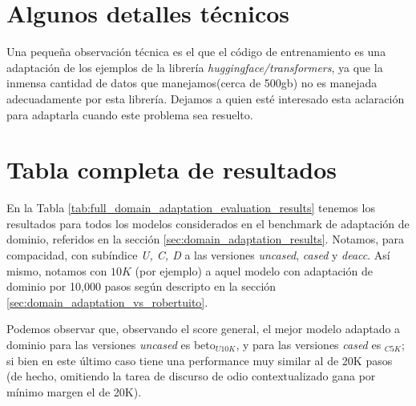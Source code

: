 
\section{Algunos detalles técnicos}

Una pequeña observación técnica es el que el código de entrenamiento es una adaptación de los ejemplos de la librería \emph{huggingface/transformers}, ya que la inmensa cantidad de datos que manejamos(cerca de 500gb) no es manejada adecuadamente por esta librería. Dejamos a quien esté interesado esta aclaración para adaptarla cuando este problema sea resuelto.

\section{Tabla completa de resultados}



En la Tabla \ref{tab:full_domain_adaptation_evaluation_results} tenemos los resultados para todos los modelos considerados en el benchmark de adaptación de dominio, referidos en la sección \ref{sec:domain_adaptation_results}. Notamos, para compacidad, con subíndice \emph{U, C, D} a las versiones  \emph{uncased}, \emph{cased} y \emph{deacc}. Así mismo, notamos con $10K$ (por ejemplo) a aquel modelo con adaptación de dominio por 10,000 pasos según descripto en la sección \ref{sec:domain_adaptation_vs_robertuito}.

Podemos observar que, observando el score general, el mejor modelo adaptado a dominio para las versiones \emph{uncased} es beto$_{U10K}$, y para las versiones \emph{cased} es \beto{}$_{C5K}$; si bien en este último caso tiene una performance muy similar al de 20K pasos (de hecho, omitiendo la tarea de discurso de odio contextualizado gana por mínimo margen el de 20K).

